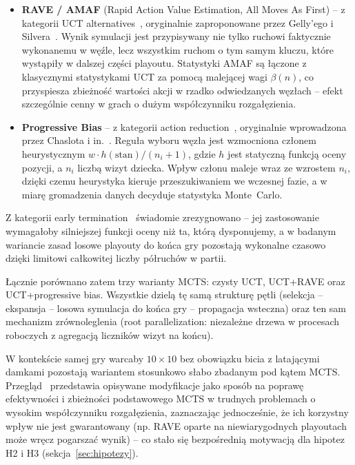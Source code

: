 \documentclass[11pt,a4paper]{article}
\begin{document}
\begin{itemize}
    \item \textbf{RAVE / AMAF} (Rapid Action Value Estimation, All Moves
        As First) -- z kategorii UCT
        alternatives~\cite{swiechowski2023mcts}, oryginalnie
        zaproponowane przez Gelly'ego i
        Silvera~\cite{gelly2007combining, gelly2011monte}. Wynik symulacji
        jest przypisywany nie tylko ruchowi faktycznie wykonanemu w węźle,
        lecz wszystkim ruchom o tym samym kluczu, które wystąpiły w dalszej
        części playoutu. Statystyki AMAF są łączone z klasycznymi
        statystykami UCT za pomocą malejącej wagi $\beta(n)$, co
        przyspiesza zbieżność wartości akcji w rzadko odwiedzanych węzłach
        -- efekt szczególnie cenny w grach o dużym współczynniku
        rozgałęzienia.
    \item \textbf{Progressive Bias} -- z kategorii action
        reduction~\cite{swiechowski2023mcts}, oryginalnie wprowadzona
        przez Chaslota i in.~\cite{chaslot2008progressive}. Reguła wyboru
        węzła jest wzmocniona członem heurystycznym
        $w \cdot h(\text{stan})/(n_i+1)$, gdzie $h$ jest statyczną funkcją
        oceny pozycji, a $n_i$ liczbą wizyt dziecka. Wpływ członu maleje
        wraz ze wzrostem $n_i$, dzięki czemu heurystyka kieruje
        przeszukiwaniem we wczesnej fazie, a w miarę gromadzenia danych
        decyduje statystyka Monte~Carlo.
\end{itemize}

Z kategorii early termination~\cite{swiechowski2023mcts}
świadomie zrezygnowano -- jej zastosowanie wymagałoby silniejszej funkcji
oceny niż ta, którą dysponujemy, a w badanym wariancie zasad losowe
playouty do końca gry pozostają wykonalne czasowo dzięki limitowi
całkowitej liczby półruchów w partii.

Łącznie porównano zatem trzy warianty MCTS: czysty UCT,
UCT+RAVE oraz UCT+progressive bias. Wszystkie dzielą tę
samą strukturę pętli (selekcja -- ekspansja -- losowa symulacja do końca
gry -- propagacja wsteczna) oraz ten sam mechanizm zrównoleglenia (root
parallelization: niezależne drzewa w procesach roboczych z agregacją
liczników wizyt na końcu).

W kontekście samej gry warcaby $10\times10$ bez obowiązku bicia z
latającymi damkami pozostają wariantem stosunkowo słabo zbadanym pod kątem
MCTS. Przegląd~\cite{swiechowski2023mcts} przedstawia opisywane
modyfikacje jako sposób na poprawę efektywności i zbieżności
podstawowego MCTS w trudnych problemach o wysokim współczynniku
rozgałęzienia, zaznaczając jednocześnie, że ich korzystny wpływ nie jest
gwarantowany (np. RAVE oparte na niewiarygodnych playoutach może wręcz
pogarszać wynik) -- co stało się bezpośrednią motywacją dla hipotez H2 i
H3 (sekcja~\ref{sec:hipotezy}).
\end{document}
